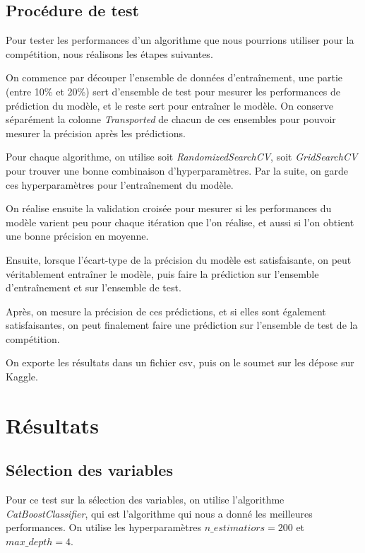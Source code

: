 \documentclass[a4paper]{article}
\begin{document}
    \subsection{Procédure de test}

    Pour tester les performances d'un algorithme que nous pourrions utiliser pour la compétition, nous réalisons les étapes suivantes.

    On commence par découper l'ensemble de données d'entraînement, une partie (entre 10\% et 20\%) sert d'ensemble de test pour
    mesurer les performances de prédiction du modèle, et le reste sert pour entraîner le modèle.
    On conserve séparément la colonne {\it Transported} de chacun de ces ensembles pour pouvoir mesurer la précision après les prédictions.

    Pour chaque algorithme, on utilise soit {\it RandomizedSearchCV}, soit {\it GridSearchCV} pour trouver une bonne combinaison d'hyperparamètres.
    Par la suite, on garde ces hyperparamètres pour l'entraînement du modèle.

    On réalise ensuite la validation croisée pour mesurer si les performances du modèle varient peu pour chaque itération que l'on réalise,
    et aussi si l'on obtient une bonne précision en moyenne.

    Ensuite, lorsque l'écart-type de la précision du modèle est satisfaisante, on peut véritablement entraîner le modèle, puis
    faire la prédiction sur l'ensemble d'entraînement et sur l'ensemble de test.

    Après, on mesure la précision de ces prédictions, et si elles sont également satisfaisantes, on peut finalement 
    faire une prédiction sur l'ensemble de test de la compétition.

    On exporte les résultats dans un fichier csv, puis on le soumet sur les dépose sur Kaggle.

    \section{Résultats}

    \subsection{Sélection des variables}

    Pour ce test sur la sélection des variables, on utilise l'algorithme {\it CatBoostClassifier}, qui est l'algorithme qui nous a donné les meilleures performances. 
    On utilise les hyperparamètres $n\_estimatiors = 200$ et $max\_depth = 4$.
\end{document}
